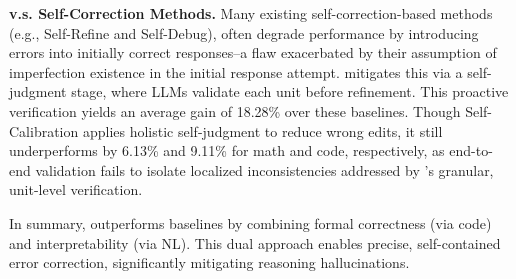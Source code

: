 \noindent\textbf{\tool v.s. Self-Correction Methods.}
Many existing self-correction-based methods (e.g., Self-Refine and Self-Debug), often degrade performance by introducing errors into initially correct responses--a flaw exacerbated by their assumption of imperfection existence in the initial response attempt.
\tool mitigates this via a self-judgment stage, where LLMs validate each unit before refinement. This proactive verification yields an average gain of 18.28\% over these baselines. 
Though Self-Calibration applies holistic self-judgment to reduce wrong edits, it still underperforms \tool by 6.13\% and 9.11\% for math and code, respectively, as end-to-end validation fails to isolate localized inconsistencies addressed by \tool’s granular, unit-level verification.

In summary, \tool outperforms baselines by combining formal correctness (via code) and interpretability (via NL). This dual approach enables precise, self-contained error correction, significantly mitigating reasoning hallucinations.






